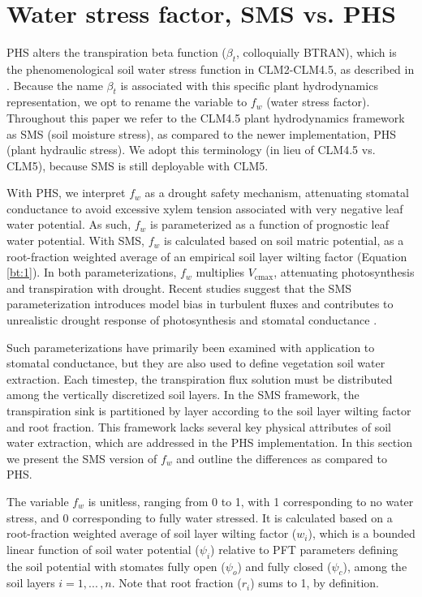 \documentclass[draft,linenumbers]{agujournal}
\begin{document}

\section{Water stress factor, SMS vs. PHS}
\label{sect:btran}
    PHS alters the transpiration beta function ($\beta_t$, colloquially BTRAN), 
    which is the phenomenological soil water stress function in CLM2-CLM4.5, as described in \citet{oleson2013}.
    Because the name $\beta_t$ is associated with this specific plant hydrodynamics representation, we opt to rename the variable to $f_w$ (water stress factor).
    Throughout this paper we refer to the CLM4.5 plant hydrodynamics framework as SMS (soil moisture stress), 
    as compared to the newer implementation, PHS (plant hydraulic stress).
    We adopt this terminology (in lieu of CLM4.5 vs. CLM5), because SMS is still deployable with CLM5. 
    
    With PHS, we interpret $f_w$ as a drought safety mechanism, attenuating stomatal conductance to avoid
    excessive xylem tension associated with very negative leaf water potential.
    As such, $f_w$ is parameterized as a function of prognostic leaf water potential.
    With SMS, $f_w$ is calculated based on soil matric potential, 
    as a root-fraction weighted average of an empirical soil layer wilting factor (Equation \ref{bt:1}).
    In both parameterizations, $f_w$ multiplies $V_{\text{cmax}}$, attenuating photosynthesis and transpiration with drought.
    Recent studies suggest that the SMS parameterization introduces model bias in turbulent fluxes \citep{bonan2014}
    and contributes to unrealistic drought response of photosynthesis and stomatal conductance \citep{powell2013}.

    
    Such parameterizations have primarily been examined with application to stomatal conductance, but they are also used to define vegetation soil water extraction. 
    Each timestep, the transpiration flux solution must be distributed among the vertically discretized soil layers.
    In the SMS framework, the transpiration sink is partitioned by layer according to the soil layer wilting factor and root fraction.
    This framework lacks several key physical attributes of soil water extraction, which are addressed in the PHS implementation.
    In this section we present the SMS version of $f_w$ and outline the differences as compared to PHS.
    
    The variable $f_w$ is unitless, ranging from 0 to 1, with 1 corresponding to no water stress, and 0 corresponding to fully water stressed. 
    It is calculated based on a root-fraction weighted average of soil layer wilting factor ($w_i$), which is a bounded linear 
    function of soil water potential ($\psi_i$) relative to PFT parameters defining the soil potential with stomates fully open ($
    \psi_{o}$) and fully closed ($\psi_{c}$), among the soil layers $i=1,...\,,n$. Note that root fraction ($r_i$) sums to 1, by definition.
    
\end{document}
